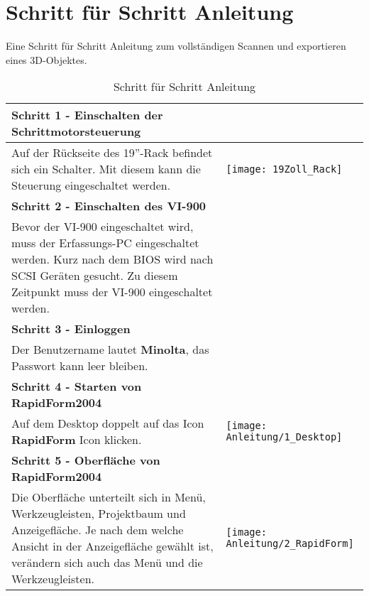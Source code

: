 \section{Schritt für Schritt Anleitung}
\label{sec:StepbyStep}
Eine Schritt für Schritt Anleitung zum vollständigen Scannen und exportieren eines 3D-Objektes.

\begin{longtable}{|>{\RaggedRight}m{5cm}|m{8cm}|} 
\caption{Schritt für Schritt Anleitung} 
\label{tab:StepbyStep}
\\ \hline



\multicolumn{2}{|l|}%
{{\textbf{Schritt 1 - Einschalten der Schrittmotorsteuerung}}}
\\ \hline
Auf der Rückseite des 19''-Rack befindet sich ein Schalter. Mit diesem kann die Steuerung eingeschaltet werden.
& 
\texttt{[image: 19Zoll\_Rack]}
\\ \hline 

\multicolumn{2}{|l|}%
{{\textbf{Schritt 2 - Einschalten des VI-900}}}
\\ \hline
\multicolumn{2}{|p{13cm}|}%
{Bevor der VI-900 eingeschaltet wird, muss der Erfassungs-PC eingeschaltet werden. Kurz nach dem BIOS wird nach SCSI Geräten gesucht. Zu diesem Zeitpunkt muss der VI-900 eingeschaltet werden.}
\\ \hline 
 
\multicolumn{2}{|l|}%
{{\textbf{Schritt 3 - Einloggen}}}
\\ \hline
\multicolumn{2}{|l|}%
{{Der Benutzername lautet \textbf{Minolta}, das Passwort kann leer bleiben.}}
\\ \hline  
 
\multicolumn{2}{|l|}%
{{\textbf{Schritt 4 - Starten von RapidForm2004}}}
\\ \hline
Auf dem Desktop doppelt auf das Icon \textbf{RapidForm} Icon klicken.
& 
\texttt{[image: Anleitung/1\_Desktop]}
\\ \hline 

\multicolumn{2}{|l|}%
{{\textbf{Schritt 5 - Oberfläche von RapidForm2004}}}
\\ \hline
Die Oberfläche unterteilt sich in Menü, Werkzeugleisten, Projektbaum und Anzeigefläche.
Je nach dem welche Ansicht in der Anzeigefläche gewählt ist, verändern sich auch das Menü und die Werkzeugleisten. 
& 
\texttt{[image: Anleitung/2\_RapidForm]}
\\ \hline  


\end{longtable}
